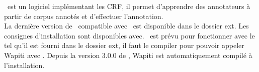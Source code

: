 \documentclass[manual-fr.tex]{subfiles}
\begin{document}
\WapitiCite\ est un logiciel implémentant les CRF, il permet d'apprendre des annotateurs à partir de corpus annotés et d'effectuer l'annotation.\\

La dernière version de \Wapiti\ compatible avec \SEM\ est disponible dans le dossier ext. Les consignes d'installation sont disponibles avec. \SEM\ est prévu pour fonctionner avec le \Wapiti tel qu'il est fourni dans le dossier ext, il faut le compiler pour pouvoir appeler Wapiti avec \SEM. Depuis la version 3.0.0 de \SEM, Wapiti est automatiquement compilé à l'installation.
\end{document}
